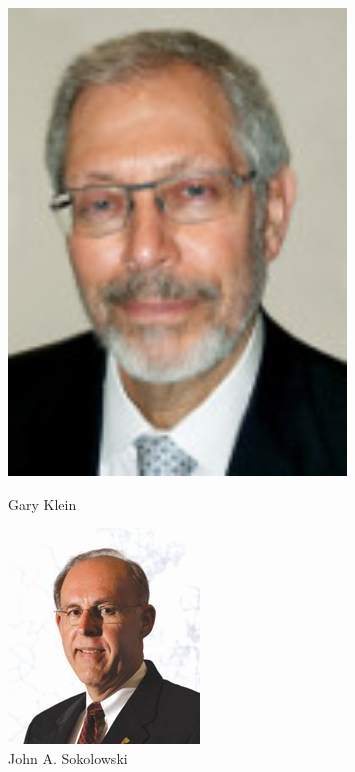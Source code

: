 \documentclass{article}
\begin{document}
\begin{figure}[H]
\centering
\begin{minipage}[H]{0.3\linewidth}
	\centering
	\includegraphics[width=0.8\textwidth]{../ressources/klein}
	\caption{Gary Klein}
\end{minipage}
\hspace{0.1\linewidth}
\begin{minipage}[H]{0.3\linewidth}
	\centering
    \includegraphics[width=\textwidth]{../ressources/john_sokolowski}
    \caption{John A. Sokolowski}
\end{minipage}
\hfill
\end{figure}
\end{document}
